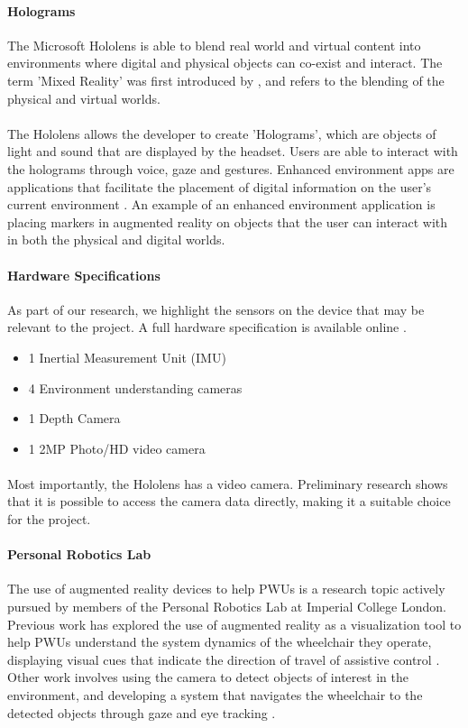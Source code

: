 \paragraph{Holograms}The Microsoft Hololens is able to blend real world and virtual content into environments where digital and physical objects can co-exist and interact. The term 'Mixed Reality' was first introduced by \cite{Milgram1994}, and refers to the blending of the physical and virtual worlds.

\paragraph{}The Hololens allows the developer to create 'Holograms', which are objects of light and sound that are displayed by the headset. Users are able to interact with the holograms through voice, gaze and gestures. Enhanced environment apps are applications that facilitate the placement of digital information on the user's current environment \citep{Microsofta}. An example of an enhanced environment application is placing markers in augmented reality on objects that the user can interact with in both the physical and digital worlds. 

\paragraph{Hardware Specifications} As part of our research, we highlight the sensors on the device that may be relevant to the project. A full hardware specification is available online \cite{Microsoft2015}. 

\begin{itemize}
	\item 1 Inertial Measurement Unit (IMU)
	\item 4 Environment understanding cameras
	\item 1 Depth Camera
	\item 1 2MP Photo/HD video camera
\end{itemize}

\paragraph{} Most importantly, the Hololens has a video camera. Preliminary research shows that it is possible to access the camera data directly, making it a suitable choice for the project.

\paragraph{Personal Robotics Lab} The use of augmented reality devices to help PWUs is a research topic actively pursued by members of the Personal Robotics Lab at Imperial College London. Previous work has explored the use of augmented reality as a visualization tool to help PWUs understand the system dynamics of the wheelchair they operate, displaying visual cues that indicate the direction of travel of assistive control \cite{Zolotas2018}. Other work involves using the camera to detect objects of interest in the environment, and developing a system that navigates the wheelchair to the detected objects through gaze and eye tracking \cite{Chacon-Quesada}.


